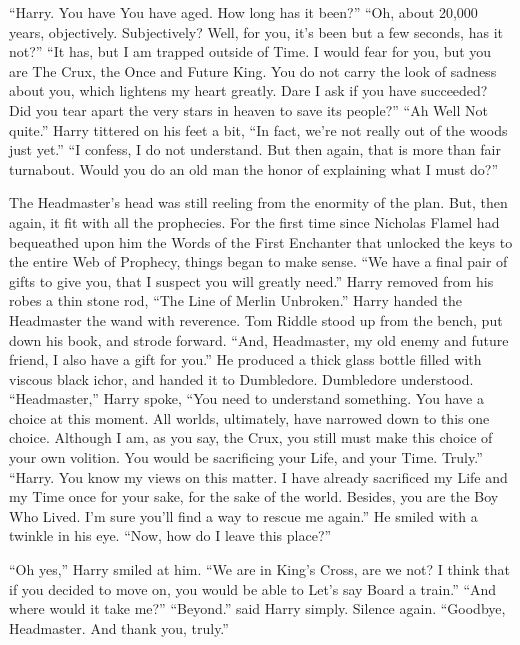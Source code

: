 “Harry. You have{\el} You have aged. How long has it been?”
\SmallVSpace
“Oh, about 20,000 years, objectively. Subjectively? Well, for you, it’s been but a few seconds, has it not?”
\SmallVSpace
“It has, but I am trapped outside of Time. I would fear for you, but you are The Crux, the Once and Future King. You do not carry the look of sadness about you, which lightens my heart greatly. Dare I ask if you have succeeded? Did you tear apart the very stars in heaven to save its people?”
\SmallVSpace
“Ah{\el} Well{\el} Not quite.” Harry tittered on his feet a bit, “In fact, we’re not really out of the woods just yet.”
\SmallVSpace
“I confess, I do not understand. But then again, that is more than fair turnabout. Would you do an old man the honor of explaining what I must do?”
\simpleline
{}

The Headmaster’s head was still reeling from the enormity of the plan. But, then again, it fit with all the prophecies. For the first time since Nicholas Flamel had bequeathed upon him the Words of the First Enchanter that unlocked the keys to the entire Web of Prophecy, things began to make sense.
\SmallVSpace
“We have a final pair of gifts to give you, that I suspect you will greatly need.” Harry removed from his robes a thin stone rod, “The Line of Merlin Unbroken.” Harry handed the Headmaster the wand with reverence.
\SmallVSpace
Tom Riddle stood up from the bench, put down his book, and strode forward. “And, Headmaster, my old enemy and future friend, I also have a gift for you.” He produced a thick glass bottle filled with viscous black ichor, and handed it to Dumbledore.
\SmallVSpace
Dumbledore understood.
\SmallVSpace
“Headmaster,” Harry spoke, “You need to understand something. You have a choice at this moment. All worlds, ultimately, have narrowed down to this one choice. Although I am, as you say, the Crux, you still must make this choice of your own volition. You would be sacrificing your Life, and your Time. Truly.”
\SmallVSpace
“Harry. You know my views on this matter. I have already sacrificed my Life and my Time once for your sake, for the sake of the world. Besides, you are the Boy Who Lived. I’m sure you’ll find a way to rescue me again.” He smiled with a twinkle in his eye. “Now, how do I leave this place?”

“Oh yes,” Harry smiled at him. “We are in King’s Cross, are we not? I think that if you decided to move on, you would be able to{\el} Let’s say{\el} Board a train.”
\SmallVSpace
“And where would it take me?”
\SmallVSpace
“Beyond.” said Harry simply.
\SmallVSpace
Silence again.
\SomeVSpace
“Goodbye, Headmaster. And thank you, truly.”

